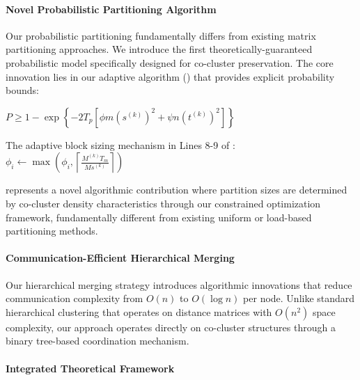 \documentclass{ar2rc}
\theoremstyle{definition}
\theoremstyle{remark} %
\begin{document}



\paragraph{Novel Probabilistic Partitioning Algorithm}

Our probabilistic partitioning fundamentally differs from existing matrix partitioning approaches. We introduce the first theoretically-guaranteed probabilistic model specifically designed for co-cluster preservation. The core innovation lies in our adaptive algorithm () that provides explicit probability bounds:

$P \geq 1 - \exp\left\{-2T_p\left[\phi m (s^{(k)})^2 + \psi n (t^{(k)})^2\right]\right\}$

The adaptive block sizing mechanism in Lines 8-9 of :
$\phi_i \leftarrow \max\left(\phi_i, \left\lceil\frac{M^{(k)}T_m}{Ms^{(k)}}\right\rceil\right)$

represents a novel algorithmic contribution where partition sizes are determined by co-cluster density characteristics through our constrained optimization framework, fundamentally different from existing uniform or load-based partitioning methods.

\paragraph{Communication-Efficient Hierarchical Merging}

Our hierarchical merging strategy introduces algorithmic innovations that reduce communication complexity from $O(n)$ to $O(\log n)$ per node. Unlike standard hierarchical clustering that operates on distance matrices with $O(n^2)$ space complexity, our approach operates directly on co-cluster structures through a binary tree-based coordination mechanism.

\paragraph{Integrated Theoretical Framework}
\end{document}
